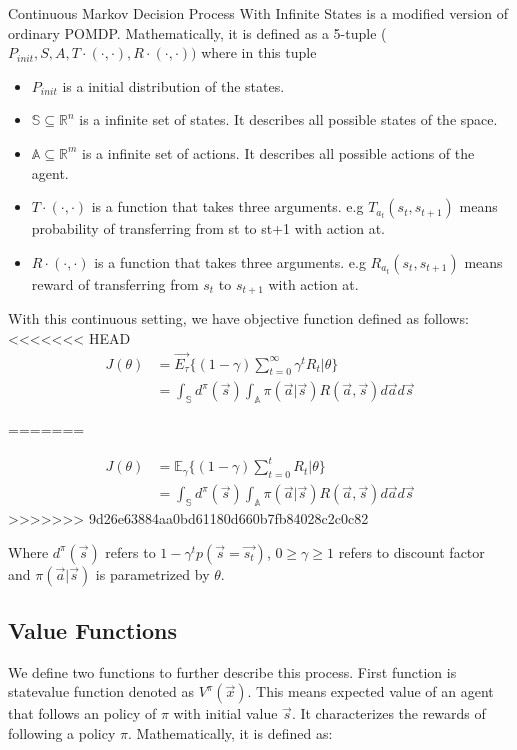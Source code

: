 \documentclass[officiallayout]{tktla}
\begin{document}
Continuous Markov Decision Process With Infinite States is a modified version of ordinary POMDP. Mathematically, it is defined as a 5-tuple ($P_{init},S,A,T\cdot(\cdot,\cdot),R\cdot(\cdot,\cdot))$ where in this tuple
\begin{itemize}
\item	$P_{init}$ is a initial distribution of the states.
\item	$\mathbb{S} \subseteq \mathbb{R}^n$ is a infinite set of states. It describes all possible states of the space.
\item	$\mathbb{A} \subseteq \mathbb{R}^m$ is a infinite set of actions. It describes all possible actions of the agent.
\item	$T\cdot(\cdot,\cdot)$ is a function that takes three arguments. e.g $T_{a_t}(s_t,s_{t+1})$ means probability of transferring from st to st+1 with action at.
\item	$R\cdot(\cdot,\cdot)$ is a function that takes three arguments. e.g $R_{a_t}(s_t,s_{t+1})$ means reward of transferring from $s_t$ to $s_{t+1}$ with action at.
\end{itemize}

With this continuous setting, we have objective function defined as follows:
<<<<<<< HEAD
\begin{align}
J(\theta) &= \vec{E_\tau}\{(1-\gamma)\sum_{t=0}^{\infty}\gamma^tR_t|\theta\} \\
&= \int_\mathbb{S}d^\pi(\vec{s})\int_\mathbb{A}\pi(\vec{a}|\vec{s})R(\vec{a}, \vec{s})d\vec{a}d\vec{s}
\end{align}

=======

\begin{align}
J(\theta) &= \mathbb{E}_\gamma\{(1-\gamma)\sum_{t=0}^tR_t|\theta\} \\
&=\int_\mathbb{S}d^\pi(\vec{s})\int_\mathbb{A}\pi(\vec{a}|\vec{s})R(\vec{a}, \vec{s})d\vec{a}d\vec{s}
\end{align}
>>>>>>> 9d26e63884aa0bd61180d660b7fb84028c2c0c82

Where $d^\pi(\vec{s})$ refers to $1 - \gamma^tp(\vec{s} = \vec{s_t})$, $0 \geq \gamma \geq 1$ refers to discount factor and $\pi(\vec{a}|\vec{s})$ is parametrized by $\theta$.
\subsection{Value Functions}
We define two functions to further describe this process. First function is statevalue
function denoted as $V^\pi(\vec{x})$. This means expected value of an agent that follows
an policy of $\pi$ with initial value $\vec{s}$. It characterizes the rewards of following a policy $\pi$. Mathematically, it is defined as:
\end{document}
